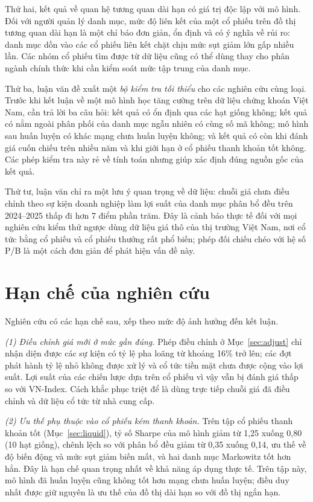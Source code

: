 Thứ hai, kết quả về quan hệ tương quan dài hạn có giá trị độc lập với mô hình. Đối với người quản lý danh mục, mức độ liên kết của một cổ phiếu trên đồ thị tương quan dài hạn là một chỉ báo đơn giản, ổn định và có ý nghĩa về rủi ro: danh mục dồn vào các cổ phiếu liên kết chặt chịu mức sụt giảm lớn gấp nhiều lần. Các nhóm cổ phiếu tìm được từ dữ liệu cũng có thể dùng thay cho phân ngành chính thức khi cần kiểm soát mức tập trung của danh mục.

Thứ ba, luận văn đề xuất một \emph{bộ kiểm tra tối thiểu} cho các nghiên cứu cùng loại. Trước khi kết luận về một mô hình học tăng cường trên dữ liệu chứng khoán Việt Nam, cần trả lời ba câu hỏi: kết quả có ổn định qua các hạt giống không; kết quả có nằm ngoài phân phối của danh mục ngẫu nhiên có cùng số mã không; mô hình sau huấn luyện có khác mạng chưa huấn luyện không; và kết quả có còn khi đánh giá cuốn chiếu trên nhiều năm và khi giới hạn ở cổ phiếu thanh khoản tốt không. Các phép kiểm tra này rẻ về tính toán nhưng giúp xác định đúng nguồn gốc của kết quả.

Thứ tư, luận văn chỉ ra một lưu ý quan trọng về dữ liệu: chuỗi giá chưa điều chỉnh theo sự kiện doanh nghiệp làm lợi suất của danh mục phân bổ đều trên 2024--2025 thấp đi hơn 7 điểm phần trăm. Đây là cảnh báo thực tế đối với mọi nghiên cứu kiểm thử ngược dùng dữ liệu giá thô của thị trường Việt Nam, nơi cổ tức bằng cổ phiếu và cổ phiếu thưởng rất phổ biến; phép đối chiếu chéo với hệ số P/B là một cách đơn giản để phát hiện vấn đề này.

\section{Hạn chế của nghiên cứu}
\label{sec:hanche}

Nghiên cứu có các hạn chế sau, xếp theo mức độ ảnh hưởng đến kết luận.

\textit{(1) Điều chỉnh giá mới ở mức gần đúng.} Phép điều chỉnh ở Mục~\ref{sec:adjust} chỉ nhận diện được các sự kiện có tỷ lệ pha loãng từ khoảng 16\% trở lên; các đợt phát hành tỷ lệ nhỏ không được xử lý và cổ tức tiền mặt chưa được cộng vào lợi suất. Lợi suất của các chiến lược dựa trên cổ phiếu vì vậy vẫn bị đánh giá thấp so với VN-Index. Cách khắc phục triệt để là dùng trực tiếp chuỗi giá đã điều chỉnh và dữ liệu cổ tức từ nhà cung cấp.

\textit{(2) Ưu thế phụ thuộc vào cổ phiếu kém thanh khoản.} Trên tập cổ phiếu thanh khoản tốt (Mục~\ref{sec:liquid}), tỷ số Sharpe của mô hình giảm từ 1,25 xuống 0,80 (10 hạt giống), chênh lệch so với phân bổ đều giảm từ 0,35 xuống 0,14, ưu thế về độ biến động và mức sụt giảm biến mất, và hai danh mục Markowitz tốt hơn hẳn. Đây là hạn chế quan trọng nhất về khả năng áp dụng thực tế. Trên tập này, mô hình đã huấn luyện cũng không tốt hơn mạng chưa huấn luyện; điều duy nhất được giữ nguyên là ưu thế của đồ thị dài hạn so với đồ thị ngắn hạn.

